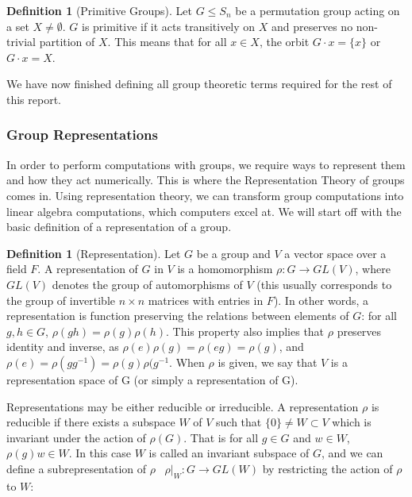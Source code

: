 \documentclass[11pt]{article} %
\theoremstyle{definition}
\newtheorem{definition}[theorem]{Definition}
\theoremstyle{remark}
\begin{document}
\begin{definition}[Primitive Groups]
Let $G \leq S_n$ be a permutation group acting on a set $X \neq \emptyset$. $G$ is primitive if it acts transitively on $X$ and preserves no non-trivial partition of $X$. This means that for all $x \in X$, the orbit $G \cdot x = \lbrace x \rbrace$ or $G \cdot x = X$.
\end{definition}

We have now finished defining all group theoretic terms required for the rest of this report.

\subsubsection{Group Representations}

In order to perform computations with groups, we require ways to represent them and how they act numerically. This is where the Representation Theory of groups comes in. Using representation theory, we can transform group computations into linear algebra computations, which computers excel at. We will start off with the basic definition of a representation of a group.

\begin{definition} [Representation]
Let $G$ be a group and $V$ a vector space over a field $F$. A representation of $G$ in $V$ is a homomorphism $\rho : G \to GL(V)$, where $GL(V)$ denotes the group of automorphisms of $V$ (this usually corresponds to the group of invertible $n \times n$ matrices with entries in $F$). In other words, a representation is function preserving the relations between elements of $G$: for all $g, h \in G$, $\rho(gh) = \rho(g)\rho(h)$. This property also implies that $\rho$ preserves identity and inverse, as $\rho(e)\rho(g) = \rho(eg) = \rho(g)$, and $\rho(e) = \rho(gg^{-1}) = \rho(g)\rho(g^{-1}$. When $\rho$ is given, we say that $V$ is a representation space of G (or simply a representation of G).
\end{definition}

Representations may be either reducible or irreducible. A representation $\rho$ is reducible if there exists a subspace $W$ of $V$ such that $\lbrace 0 \rbrace \neq W \subset V$ which is invariant under the action of $\rho(G)$. That is for all $g \in G$ and $w \in W$, $\rho(g)w \in W$. In this case $W$ is called an invariant subspace of $G$, and we can define a subrepresentation of $\rho$ \ $\rho|_W : G \to GL(W)$ by restricting the action of $\rho$ to $W$:
\end{document}
